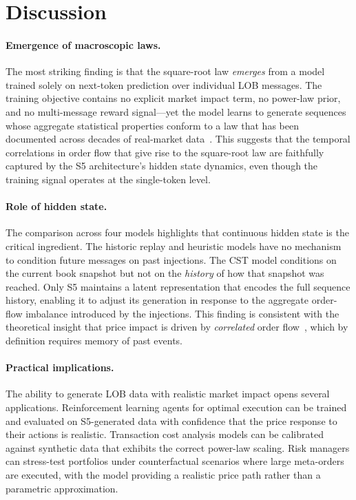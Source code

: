 \documentclass[sigplan,screen,anonymous]{acmart}
\begin{document}
\section{Discussion}
\label{sec:discussion}

\paragraph{Emergence of macroscopic laws.} The most striking finding is that the square-root law \emph{emerges} from a model trained solely on next-token prediction over individual LOB messages. The training objective contains no explicit market impact term, no power-law prior, and no multi-message reward signal---yet the model learns to generate sequences whose aggregate statistical properties conform to a law that has been documented across decades of real-market data~\cite{bouchaud2018trades, lillo2003master}. This suggests that the temporal correlations in order flow that give rise to the square-root law are faithfully captured by the S5 architecture's hidden state dynamics, even though the training signal operates at the single-token level.

\paragraph{Role of hidden state.} The comparison across four models highlights that continuous hidden state is the critical ingredient. The historic replay and heuristic models have no mechanism to condition future messages on past injections. The CST model conditions on the current book snapshot but not on the \emph{history} of how that snapshot was reached. Only S5 maintains a latent representation that encodes the full sequence history, enabling it to adjust its generation in response to the aggregate order-flow imbalance introduced by the injections. This finding is consistent with the theoretical insight that price impact is driven by \emph{correlated} order flow~\cite{farmer2013efficiency, bouchaud2018trades}, which by definition requires memory of past events.

\paragraph{Practical implications.} The ability to generate LOB data with realistic market impact opens several applications. Reinforcement learning agents for optimal execution can be trained and evaluated on S5-generated data with confidence that the price response to their actions is realistic. Transaction cost analysis models can be calibrated against synthetic data that exhibits the correct power-law scaling. Risk managers can stress-test portfolios under counterfactual scenarios where large meta-orders are executed, with the model providing a realistic price path rather than a parametric approximation.
\end{document}
